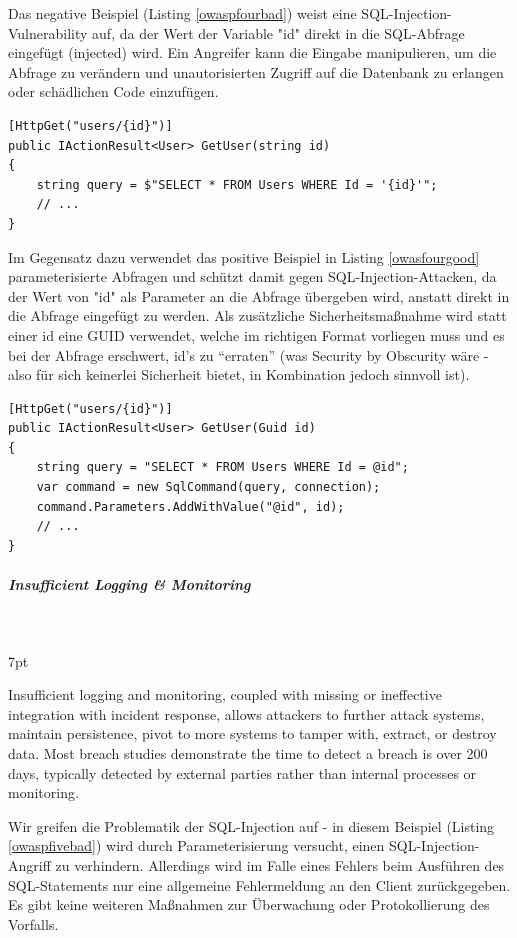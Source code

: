 \documentclass[notitlepage, hidelinks]{article}
\newenvironment{formal}{%
  \def\FrameCommand{%
    \hspace{1pt}%
    {\color{black}\vrule width 2pt}%
    {\color{formalshade}\vrule width 4pt}%
    \colorbox{formalshade}%
  }%
  \MakeFramed{\advance\hsize-\width\FrameRestore}%
  \noindent\hspace{-4.55pt}%
  \begin{adjustwidth}{}{7pt}%
  \vspace{2pt}\vspace{2pt}%
}
{%
  \vspace{2pt}\end{adjustwidth}\endMakeFramed%
}
\begin{document}
Das negative Beispiel (Listing \ref{owaspfourbad}) weist eine SQL-Injection-Vulnerability auf, da der Wert der Variable "id" direkt in die SQL-Abfrage eingefügt (injected) wird. Ein Angreifer kann die Eingabe manipulieren, um die Abfrage zu verändern und unautorisierten Zugriff auf die Datenbank zu erlangen oder schädlichen Code einzufügen.

\begin{lstlisting}[language={[Sharp]C},frame=single,caption=Negativbeispiel Injection,label=owaspfourbad]
[HttpGet("users/{id}")]
public IActionResult<User> GetUser(string id)
{
    string query = $"SELECT * FROM Users WHERE Id = '{id}'";
    // ...
}
\end{lstlisting}

Im Gegensatz dazu verwendet das positive Beispiel in Listing \ref{owasfourgood} parameterisierte Abfragen und schützt damit gegen SQL-Injection-Attacken, da der Wert von "id" als Parameter an die Abfrage übergeben wird, anstatt direkt in die Abfrage eingefügt zu werden. Als zusätzliche Sicherheitsmaßnahme wird statt einer id eine GUID verwendet, welche im richtigen Format vorliegen muss und es bei der Abfrage erschwert, id's zu ``erraten'' (was Security by Obscurity wäre - also für sich keinerlei Sicherheit bietet, in Kombination jedoch sinnvoll ist).

\begin{lstlisting}[language={[Sharp]C},frame=single,caption=Positivbeispiel Injection,label=owaspfourgood]
[HttpGet("users/{id}")]
public IActionResult<User> GetUser(Guid id)
{
    string query = "SELECT * FROM Users WHERE Id = @id";
    var command = new SqlCommand(query, connection);
    command.Parameters.AddWithValue("@id", id);
    // ...
}
\end{lstlisting}


\subparagraph{Insufficient Logging \& Monitoring} \mbox{} \\
\begin{formal}
Insufficient logging and monitoring, coupled with missing or ineffective integration with incident response, allows attackers to further attack systems, maintain persistence, pivot to more systems to tamper with, extract, or destroy data. Most breach studies demonstrate the time to detect a breach is over 200 days, typically detected by external parties rather than internal processes or monitoring.
\end{formal}

Wir greifen die Problematik der SQL-Injection auf - in diesem Beispiel (Listing \ref{owaspfivebad}) wird durch Parameterisierung versucht, einen SQL-Injection-Angriff zu verhindern. Allerdings wird im Falle eines Fehlers beim Ausführen des SQL-Statements nur eine allgemeine Fehlermeldung an den Client zurückgegeben. Es gibt keine weiteren Maßnahmen zur Überwachung oder Protokollierung des Vorfalls.
\end{document}
